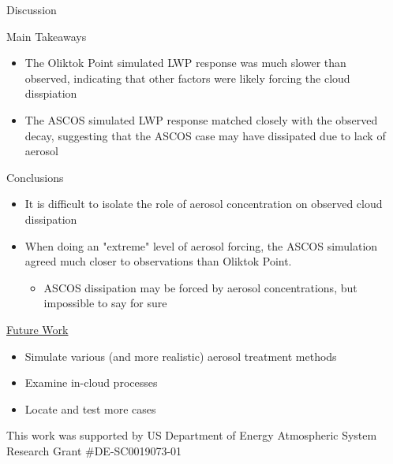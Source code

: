 \documentclass[final]{beamer}
\newlength{\sepwid}
\newlength{\onecolwid}
\begin{document}
\begin{frame}[t]
\begin{columns}[t]
\begin{column}{\onecolwid}
\begin{block}{Discussion}
	\end{block}
	\begin{alertblock}{Main Takeaways}
		\begin{itemize}
			\item The Oliktok Point simulated LWP response was much slower than observed, indicating that other factors were likely forcing the cloud disspiation	
			\item The ASCOS simulated LWP response matched closely with the observed decay, suggesting that the ASCOS case may have dissipated due to lack of aerosol
		\end{itemize}
	\end{alertblock}
	
	\begin{block}{Conclusions}
		\begin{itemize}
			\item It is difficult to isolate the role of aerosol concentration on observed cloud dissipation
			\item When doing an "extreme" level of aerosol forcing, the ASCOS simulation agreed much closer to observations than Oliktok Point.
			\begin{itemize}
				\item ASCOS dissipation may be forced by aerosol concentrations, but impossible to say for sure
			\end{itemize}
		\end{itemize}
		
		\underline{Future Work}
		\begin{itemize}
			\item Simulate various (and more realistic) aerosol treatment methods
			\item Examine in-cloud processes
			\item Locate and test more cases
		\end{itemize}
		
		
		\small{This work was supported by US Department of Energy Atmospheric System Research Grant \#DE-SC0019073-01}
	\end{block}

\end{column}
\begin{column}{\sepwid}\end{column} %

\end{columns} %

\end{frame} %
\end{document}
